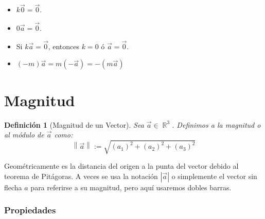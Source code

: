 \documentclass[12pt, fleqn]{report}                             %
\newenvironment{SmallIndentation}[1][0.75em]                    %
        {\begin{adjustwidth}{#1}{}\begin{footnotesize}}             %
        {\end{footnotesize}\end{adjustwidth}}                       %
\newtheorem{Definition}     {Definición}[section]               %
\theoremstyle{break}                                            %
\DeclareMathOperator \Reals        {\mathbb{R}}                 %
\newcommand{\abs}[1]    {\left\lvert #1 \right\lvert}           %
\newcommand{\Abs}[1]    {\left\lVert #1 \right\lVert}           %
\begin{document}
\begin{itemize}
\begin{SmallIndentation}[1em]
                    \end{SmallIndentation}


                    \item $k\vec{0} = \vec{0}$.
                    
                    \item $0\vec{a} = \vec{0}$.
                    
                    \item Si $k\vec{a} = \vec{0}$, entonces $k = 0$ ó $\vec{a} = \vec{0}$.
                    
                    \item $(-m)\vec{a} = m(-\vec{a}) = -(m\vec{a})$


                \end{itemize}
            



        \clearpage
        \section{Magnitud}
        
            \begin{Definition}[Magnitud de un Vector]
                Sea $\vec{a} \in \Reals^3$. Definimos a la magnitud o al módulo de $\vec{a}$ como:
                \begin{equation}
                    \Abs{\vec{a}} := \sqrt{(a_1)^2 + (a_2)^2 + (a_3)^2}
                \end{equation}
            \end{Definition}

    
            Geométricamente es la distancia del origen a la punta del vector debido al teorema
            de Pitágoras. A veces se usa la notación $\abs{\vec{a}}$ o simplemente el vector
            sin flecha $a$ para referirse a su magnitud, pero aquí usaremos dobles barras.
        

            \vspace{2em}
            \subsubsection{Propiedades}
\end{document}
